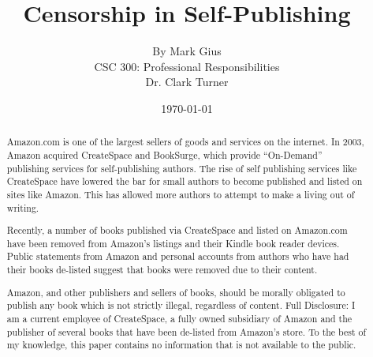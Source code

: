\documentclass[11pt]{article}
\begin{document}
\title{\vfill Censorship in Self-Publishing} %
\author{
By Mark Gius\vspace{10pt} \\ 
CSC 300: Professional Responsibilities\vspace{10pt} \\ 
Dr. Clark Turner\vspace{10pt} \\ 
}
\date{\today}

\maketitle

\vfill  %
\begin{abstract}
Amazon.com is one of the largest sellers of goods and services on the internet.  In 2003, Amazon acquired CreateSpace and BookSurge, which provide ``On-Demand'' publishing services for self-publishing authors. The rise of self publishing services like CreateSpace have lowered the bar for small authors to become published and listed on sites like Amazon. This has allowed more authors to attempt to make a living out of writing.

Recently, a number of books published via CreateSpace and listed on Amazon.com have been removed from Amazon's listings and their Kindle book reader devices.  Public statements from Amazon and personal accounts from authors who have had their books de-listed suggest that books were removed due to their content. 

Amazon, and other publishers and sellers of books, should be morally obligated to publish any book which is not strictly illegal, regardless of content.
\vfill
Full Disclosure: I am a current employee of CreateSpace, a fully owned subsidiary of Amazon and the publisher of several books that have been de-listed from Amazon's store. To the best of my knowledge, this paper contains no information that is not available to the public.
\end{abstract}

\thispagestyle{empty} %
\newpage

\thispagestyle{empty}  %
\tableofcontents
\end{document}

